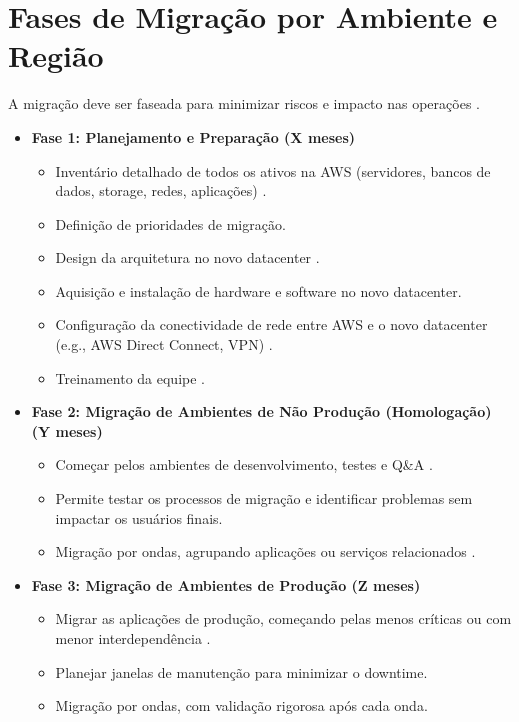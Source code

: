 \documentclass[
	12pt,				%
	oneside,			%
	a4paper,			%
	english,			%
	brazil				%
	]{abntex2unama}
\begin{document}
\section{Fases de Migração por Ambiente e Região}
A migração deve ser faseada para minimizar riscos e impacto nas operações \cite{disaster_recovery}.
\begin{itemize}
	\item \textbf{Fase 1: Planejamento e Preparação (X meses)}
	      \begin{itemize}
		      \item Inventário detalhado de todos os ativos na AWS (servidores, bancos de dados, storage, redes, aplicações) \cite{dcim_systems}.
		      \item Definição de prioridades de migração.
		      \item Design da arquitetura no novo datacenter \cite{design_principles}.
		      \item Aquisição e instalação de hardware e software no novo datacenter.
		      \item Configuração da conectividade de rede entre AWS e o novo datacenter (e.g., AWS Direct Connect, VPN) \cite{datacenter_networking}.
		      \item Treinamento da equipe \cite{dcim_evolution}.
	      \end{itemize}
	\item \textbf{Fase 2: Migração de Ambientes de Não Produção (Homologação) (Y meses)}
	      \begin{itemize}
		      \item Começar pelos ambientes de desenvolvimento, testes e Q\&A \cite{datacenter_monitoring}.
		      \item Permite testar os processos de migração e identificar problemas sem impactar os usuários finais.
		      \item Migração por ondas, agrupando aplicações ou serviços relacionados \cite{datacenter_automation}.
	      \end{itemize}
	\item \textbf{Fase 3: Migração de Ambientes de Produção (Z meses)}
	      \begin{itemize}
		      \item Migrar as aplicações de produção, começando pelas menos críticas ou com menor interdependência \cite{reliability_engineering}.
		      \item Planejar janelas de manutenção para minimizar o downtime.
		      \item Migração por ondas, com validação rigorosa após cada onda.

\end{itemize}
\end{itemize}
\end{document}
